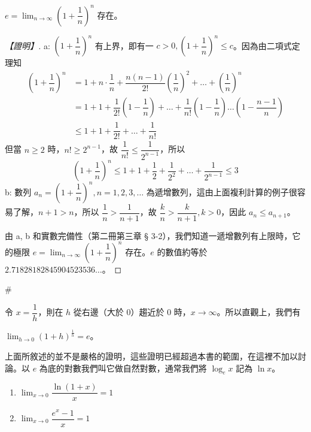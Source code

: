 \begin{theorem}\label{thm:b6s-app4-euler-e}
$e = \lim_{n\to\infty}\left(1+\dfrac{1}{n}\right)^n$ 存在。
\end{theorem}

\begin{proof}[【證明】]
a: $\left(1+\dfrac{1}{n}\right)^n$ 有上界，即有一 $c>0, \left(1+\dfrac{1}{n}\right)^n \le c$。因為由二項式定理知
\begin{align*}
\left(1+\dfrac{1}{n}\right)^n &= 1 + n\cdot\dfrac{1}{n} + \dfrac{n(n-1)}{2!}\left(\dfrac{1}{n}\right)^2 + \dots + \left(\dfrac{1}{n}\right)^n \\
&= 1 + 1 + \dfrac{1}{2!}\left(1-\dfrac{1}{n}\right) + \dots + \dfrac{1}{n!}\left(1-\dfrac{1}{n}\right)\dots\left(1-\dfrac{n-1}{n}\right) \\
&\le 1 + 1 + \dfrac{1}{2!} + \dots + \dfrac{1}{n!}
\end{align*}
但當 $n\ge 2$ 時，$n!\ge 2^{n-1}$，故 $\dfrac{1}{n!}\le\dfrac{1}{2^{n-1}}$，所以
\[ \left(1+\dfrac{1}{n}\right)^n \le 1 + 1 + \dfrac{1}{2} + \dfrac{1}{2^2} + \dots + \dfrac{1}{2^{n-1}} \le 3 \]
b: 數列 $a_n = \left(1+\dfrac{1}{n}\right)^n, n=1, 2, 3, \dots$ 為遞增數列，這由上面複利計算的例子很容易了解，$n+1>n$，所以 $\dfrac{1}{n}>\dfrac{1}{n+1}$，故 $\dfrac{k}{n}>\dfrac{k}{n+1}, k>0$，因此 $a_n \le a_{n+1}$。

由 a, b 和實數完備性（第二冊第三章 § 3-2），我們知道一遞增數列有上限時，它的極限 $e = \lim_{n\to\infty}\left(1+\dfrac{1}{n}\right)^n$ 存在。$e$ 的數值約等於 $2.71828182845904523536\dots$。
\end{proof}\hfill$\#$

令 $x=\dfrac{1}{h}$，則在 $h$ 從右邊（大於 0）趨近於 0 時，$x\longrightarrow\infty$。所以直觀上，我們有

\begin{theorem}\label{thm:b6s-app4-lim-h-e}
$\lim_{h\to 0}(1+h)^{\frac{1}{h}} = e$。
\end{theorem}

上面所敘述的並不是嚴格的證明，這些證明已經超過本書的範圍，在這裡不加以討論。以 $e$ 為底的對數我們叫它做自然對數，通常我們將 $\log_e x$ 記為 $\ln x$。

\setcounter{lemma}{5}
\begin{lemma}\label{lem:b6s-app4-e-limits}
\begin{enumerate}[label=(\roman*), leftmargin=2em]
  \item $\lim_{x\to 0}\dfrac{\ln(1+x)}{x} = 1$
  \item $\lim_{x\to 0}\dfrac{e^x-1}{x} = 1$
\end{enumerate}
\end{lemma}

